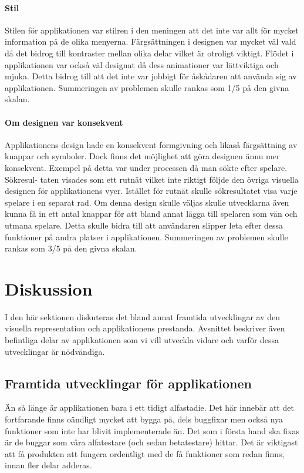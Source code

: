 \documentclass[a4paper, 11pt]{article}
\begin{document}
\paragraph{Stil}
Stilen för applikationen var stilren i den meningen att det inte var allt för mycket information på de olika menyerna. Färgsättningen i designen var mycket väl vald då det bidrog till kontraster mellan olika delar vilket är otroligt viktigt. Flödet i applikationen var också väl designat då  dess animationer var lättviktiga och mjuka. Detta bidrog till att det inte var jobbigt för åskådaren att använda sig av applikationen.
Summeringen av problemen skulle rankas som 1/5 på den givna skalan.

\paragraph{Om designen var konsekvent}
Applikationens design hade en konsekvent formgivning och likaså färgsättning av knappar och symboler. Dock finns det möjlighet att göra designen ännu mer konsekvent. Exempel på detta var under processen då man sökte efter spelare. Sökresul-
taten visades som ett rutnät vilket inte riktigt följde den övriga visuella designen för applikationens vyer. Istället för rutnät skulle sökresultatet visa varje spelare i en separat rad. Om denna design skulle väljas skulle utvecklarna även kunna få in ett antal knappar för att bland annat lägga till spelaren som vän och utmana spelare. Detta skulle bidra till att användaren slipper leta efter dessa funktioner på andra platser i applikationen.
Summeringen av problemen skulle rankas som 3/5 på den givna skalan.


\section{Diskussion}
I den här sektionen diskuteras det bland annat framtida utvecklingar av den visuella representation och applikationens prestanda. Avsnittet beskriver även befintliga delar av applikationen som vi vill utveckla vidare och varför dessa utvecklingar är nödvändiga.

\subsection{Framtida utvecklingar för applikationen}
Än så länge är applikationen bara i ett tidigt alfastadie. Det här innebär att det fortfarande finns oändligt mycket att bygga på, dels buggfixar men också nya funktioner som inte har blivit implementerade än. Det som i första hand ska fixas är de buggar som våra alfatestare (och sedan betatestare) hittar. Det är viktigast att få produkten att fungera ordentligt med de få funktioner som redan finns, innan fler delar adderas. 
\end{document}
